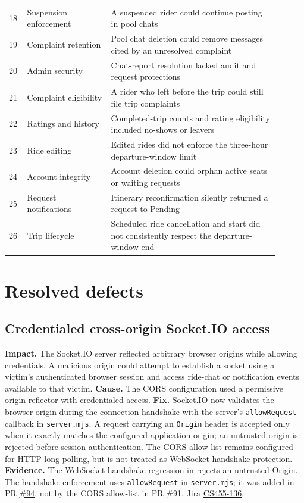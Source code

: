 \documentclass[10pt]{article}
\begin{document}
\begin{longtable}{@{}p{0.055\linewidth}p{0.28\linewidth}p{0.57\linewidth}@{}}
18 & Suspension enforcement & A suspended rider could continue posting in pool chats \\
19 & Complaint retention & Pool chat deletion could remove messages cited by an unresolved complaint \\
20 & Admin security & Chat-report resolution lacked audit and request protections \\
21 & Complaint eligibility & A rider who left before the trip could still file trip complaints \\
22 & Ratings and history & Completed-trip counts and rating eligibility included no-shows or leavers \\
23 & Ride editing & Edited rides did not enforce the three-hour departure-window limit \\
24 & Account integrity & Account deletion could orphan active seats or waiting requests \\
25 & Request notifications & Itinerary reconfirmation silently returned a request to Pending \\
26 & Trip lifecycle & Scheduled ride cancellation and start did not consistently respect the departure-window end \\
\bottomrule
\end{longtable}
\normalsize
\section{Resolved defects}
\subsection{Credentialed cross-origin Socket.IO access}
\textbf{Impact.} The Socket.IO server reflected arbitrary browser origins while allowing credentials. A malicious origin could attempt to establish a socket using a victim's authenticated browser session and access ride-chat or notification events available to that victim.
\textbf{Cause.} The CORS configuration used a permissive origin reflector with credentialed access.
\textbf{Fix.} Socket.IO now validates the browser origin during the connection handshake with the server's \texttt{allowRequest} callback in \texttt{server.mjs}. A request carrying an \texttt{Origin} header is accepted only when it exactly matches the configured application origin; an untrusted origin is rejected before session authentication. The CORS allow-list remains configured for HTTP long-polling, but is not treated as WebSocket handshake protection.
\textbf{Evidence.} The WebSocket handshake regression in  rejects an untrusted Origin. The handshake enforcement uses \texttt{allowRequest} in \texttt{server.mjs}; it was added in PR \href{https://github.com/CS455-Carpooling/Campus_Ridepooling_Automation/pull/94}{\#94}, not by the CORS allow-list in PR \#91. Jira \href{https://cs455project.atlassian.net/browse/CS455-136}{CS455-136}.
\end{document}
